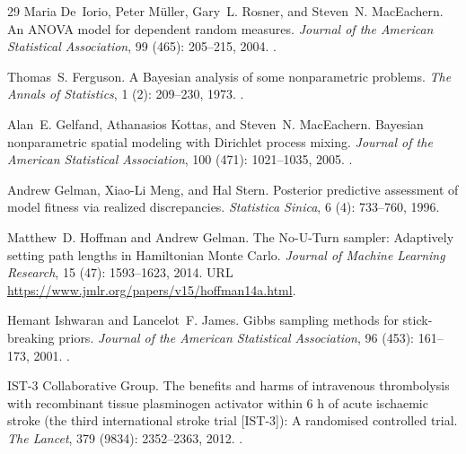 \documentclass[11pt]{article}
\begin{document}
\begin{thebibliography}{29}
Maria De~Iorio, Peter M{\"u}ller, Gary~L. Rosner, and Steven~N. MacEachern.
\newblock An {ANOVA} model for dependent random measures.
\newblock \emph{Journal of the American Statistical Association}, 99
  (465): 205--215, 2004.
\newblock {}.

Thomas~S. Ferguson.
\newblock A {B}ayesian analysis of some nonparametric problems.
\newblock \emph{The Annals of Statistics}, 1 (2): 209--230,
  1973.
\newblock {}.

Alan~E. Gelfand, Athanasios Kottas, and Steven~N. MacEachern.
\newblock Bayesian nonparametric spatial modeling with {D}irichlet process
  mixing.
\newblock \emph{Journal of the American Statistical Association}, 100
  (471): 1021--1035, 2005.
\newblock {}.

Andrew Gelman, Xiao-Li Meng, and Hal Stern.
\newblock Posterior predictive assessment of model fitness via realized
  discrepancies.
\newblock \emph{Statistica Sinica}, 6 (4): 733--760, 1996.

Matthew~D. Hoffman and Andrew Gelman.
\newblock The {No-U-Turn} sampler: Adaptively setting path lengths in
  {Hamiltonian Monte Carlo}.
\newblock \emph{Journal of Machine Learning Research}, 15
  (47): 1593--1623, 2014.
\newblock URL \url{https://www.jmlr.org/papers/v15/hoffman14a.html}.

Hemant Ishwaran and Lancelot~F. James.
\newblock Gibbs sampling methods for stick-breaking priors.
\newblock \emph{Journal of the American Statistical Association}, 96
  (453): 161--173, 2001.
\newblock {}.

{IST-3 Collaborative Group}.
\newblock The benefits and harms of intravenous thrombolysis with recombinant
  tissue plasminogen activator within 6 h of acute ischaemic stroke (the third
  international stroke trial [{IST}-3]): A randomised controlled trial.
\newblock \emph{The Lancet}, 379 (9834): 2352--2363, 2012.
\newblock {}.


\end{thebibliography}
\end{document}
